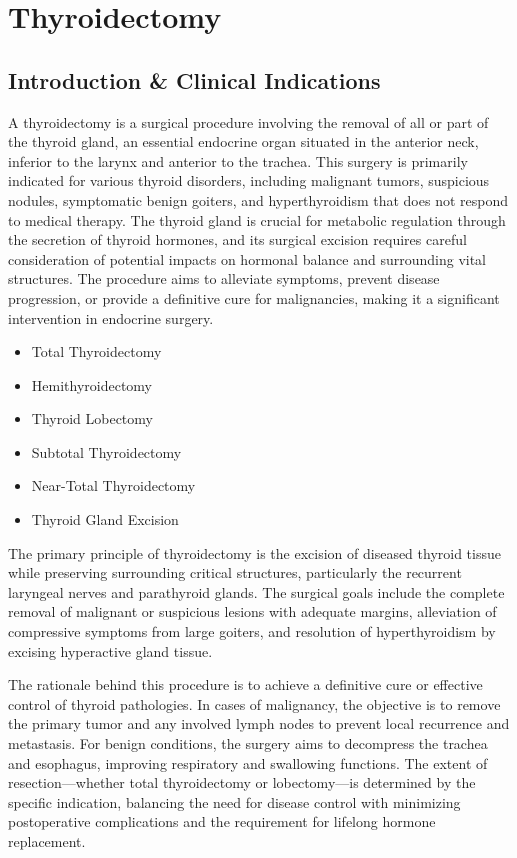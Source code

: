 \chapter{Thyroidectomy}

\section*{Introduction \& Clinical Indications}
A thyroidectomy is a surgical procedure involving the removal of all or part of the thyroid gland, an essential endocrine organ situated in the anterior neck, inferior to the larynx and anterior to the trachea. This surgery is primarily indicated for various thyroid disorders, including malignant tumors, suspicious nodules, symptomatic benign goiters, and hyperthyroidism that does not respond to medical therapy. The thyroid gland is crucial for metabolic regulation through the secretion of thyroid hormones, and its surgical excision requires careful consideration of potential impacts on hormonal balance and surrounding vital structures. The procedure aims to alleviate symptoms, prevent disease progression, or provide a definitive cure for malignancies, making it a significant intervention in endocrine surgery.

\begin{itemize}
  \item Total Thyroidectomy
  \item Hemithyroidectomy
  \item Thyroid Lobectomy
  \item Subtotal Thyroidectomy
  \item Near-Total Thyroidectomy
  \item Thyroid Gland Excision
\end{itemize}

The primary principle of thyroidectomy is the excision of diseased thyroid tissue while preserving surrounding critical structures, particularly the recurrent laryngeal nerves and parathyroid glands. The surgical goals include the complete removal of malignant or suspicious lesions with adequate margins, alleviation of compressive symptoms from large goiters, and resolution of hyperthyroidism by excising hyperactive gland tissue. 

The rationale behind this procedure is to achieve a definitive cure or effective control of thyroid pathologies. In cases of malignancy, the objective is to remove the primary tumor and any involved lymph nodes to prevent local recurrence and metastasis. For benign conditions, the surgery aims to decompress the trachea and esophagus, improving respiratory and swallowing functions. The extent of resection—whether total thyroidectomy or lobectomy—is determined by the specific indication, balancing the need for disease control with minimizing postoperative complications and the requirement for lifelong hormone replacement.

